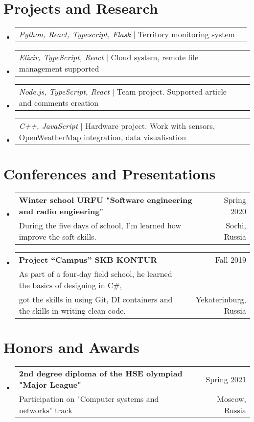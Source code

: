 \documentclass[A4,11pt]{article}
\makeatletter
\newcommand{\CVSubheading}[4]{
  \vspace{-2pt}\item
    \begin{tabular*}{0.97\textwidth}[t]{l@{\extracolsep{\fill}}r}
      \textbf{#1} & #2 \\
      \small#3 & \small #4 \\
    \end{tabular*}\vspace{-7pt}
}
\newcommand{\LittleCVSubheading}[2]{
  \vspace{-2pt}\item
    \begin{tabular*}{}[t]{l@{\extracolsep{\fill}}r}
      \emph{\small{#1}} $|$ #2 
    \end{tabular*}\vspace{-7pt}
}
\newcommand{\CVSubHeadingListStart}{\begin{itemize}[leftmargin=0.5cm, label={}]}
\newcommand{\CVSubHeadingListEnd}{\end{itemize}}
\makeatother
\begin{document}
\begin{comment}
Ideally the title of the work should speak for what it is. However if you feel
like you should explain more about why the project is applicable to this job,
use item list as is shown in the work experience section.
\end{comment}

\section{Projects and Research}

 \CVSubHeadingListStart
    \LittleCVSubheading
        {Python, React, Typescript, Flask}{Territory monitoring system}
    \LittleCVSubheading
        {Elixir, TypeScript, React}{Cloud system, remote file management supported}
    \LittleCVSubheading
        {Node.js, TypeScript, React}{Team project. Supported article and comments creation}
    \LittleCVSubheading
        {C++, JavaScript}{Hardware project. Work with sensors, OpenWeatherMap integration, data visualisation}
  \CVSubHeadingListEnd



\begin{comment}
Again the title should have already been enough, but if it is necessary to add
descriptions maintain the consistency from prior sections
\end{comment}

\section{Conferences and Presentations}
  \CVSubHeadingListStart
    \CVSubheading
      {Winter school URFU "Software engineering and radio engieering"}{Spring 2020}
      {During the five days of school, I’m learned how improve the soft-skills. }{Sochi, Russia}
    \CVSubheading
      { Project “Campus” SKB KONTUR }{Fall 2019}
      { As part of a four-day field school, he learned the basics of designing in C\#, \\
      got the skills in using Git, DI containers and the skills in writing clean code. }{ Yekaterinburg, Russia }
  \CVSubHeadingListEnd

\section{Honors and Awards}
  \CVSubHeadingListStart
    \CVSubheading
      {2nd degree diploma of the HSE olympiad "Major League"}{Spring 2021}
      {Participation on "Computer systems and networks" track}{Moscow, Russia}
  \CVSubHeadingListEnd
\end{document}
